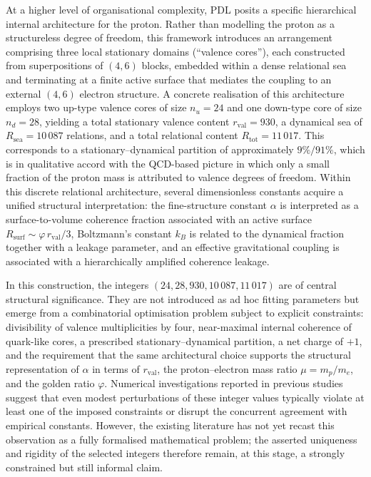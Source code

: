 \documentclass[11pt,a4paper]{article}
\begin{document}
At a higher level of organisational complexity, PDL posits a specific hierarchical internal architecture for the proton. Rather than modelling the proton as a structureless degree of freedom, this framework introduces an arrangement comprising three local stationary domains (“valence cores”), each constructed from superpositions of $(4,6)$ blocks, embedded within a dense relational sea and terminating at a finite active surface that mediates the coupling to an external $(4,6)$ electron structure.\cite{LaubscherIntroPDL2026,LaubscherPDLFull2026,LaubscherLDP2026} A concrete realisation of this architecture employs two up-type valence cores of size $n_u=24$ and one down-type core of size $n_d=28$, yielding a total stationary valence content $r_{\mathrm{val}}=930$, a dynamical sea of $R_{\mathrm{sea}}=10\,087$ relations, and a total relational content $R_{\mathrm{tot}}=11\,017$.\cite{LaubscherIntroPDL2026,LaubscherPDLFull2026} This corresponds to a stationary–dynamical partition of approximately $9\%/91\%$, which is in qualitative accord with the QCD-based picture in which only a small fraction of the proton mass is attributed to valence degrees of freedom.\cite{LaubscherIMRadPDL2026,AmslerQCDProton} Within this discrete relational architecture, several dimensionless constants acquire a unified structural interpretation: the fine-structure constant $\alpha$ is interpreted as a surface-to-volume coherence fraction associated with an active surface $R_{\mathrm{surf}}\sim\varphi\,r_{\mathrm{val}}/3$, Boltzmann’s constant $k_B$ is related to the dynamical fraction together with a leakage parameter, and an effective gravitational coupling is associated with a hierarchically amplified coherence leakage.\cite{LaubscherPDLFull2026,LaubscherLDP2026,LaubscherIMRadPDL2026,LaubscherDerivationAlpha2026,LaubscherExponent18PDL2026} 

In this construction, the integers $(24,28,930,10\,087,11\,017)$ are of central structural significance. They are not introduced as ad hoc fitting parameters but emerge from a combinatorial optimisation problem subject to explicit constraints: divisibility of valence multiplicities by four, near-maximal internal coherence of quark-like cores, a prescribed stationary–dynamical partition, a net charge of $+1$, and the requirement that the same architectural choice supports the structural representation of $\alpha$ in terms of $r_{\mathrm{val}}$, the proton–electron mass ratio $\mu=m_p/m_e$, and the golden ratio $\varphi$.\cite{LaubscherIntroPDL2026,LaubscherPDLFull2026,LaubscherLDP2026,LaubscherDerivationAlpha2026,LaubscherGoldenRatioPDL2026} Numerical investigations reported in previous studies suggest that even modest perturbations of these integer values typically violate at least one of the imposed constraints or disrupt the concurrent agreement with empirical constants.\cite{LaubscherPDLFull2026,LaubscherLDP2026,LaubscherIMRadPDL2026} However, the existing literature has not yet recast this observation as a fully formalised mathematical problem; the asserted uniqueness and rigidity of the selected integers therefore remain, at this stage, a strongly constrained but still informal claim.
\end{document}
